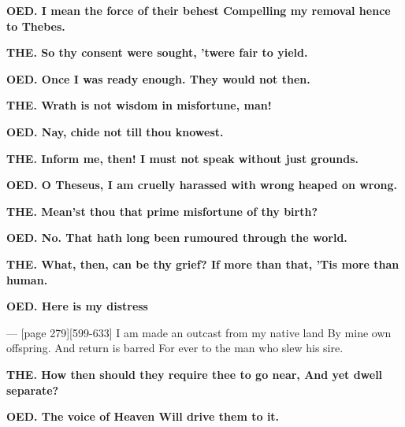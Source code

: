 \documentclass[11pt,letter]{book}
\begin{document}
\par \textbf{OED. I mean the force of their behest Compelling my removal hence to Thebes.}
\par 

\par \textbf{THE. So thy consent were sought, ’twere fair to yield.}
\par 

\par \textbf{OED. Once I was ready enough. They would not then.}
\par 

\par \textbf{THE. Wrath is not wisdom in misfortune, man!}
\par 

\par \textbf{OED. Nay, chide not till thou knowest.}
\par 

\par \textbf{THE. Inform me, then! I must not speak without just grounds.}
\par 

\par \textbf{OED. O Theseus, I am cruelly harassed with wrong heaped on wrong.}
\par 

\par \textbf{THE. Mean’st thou that prime misfortune of thy birth?}
\par 

\par \textbf{OED. No. That hath long been rumoured through the world.}
\par 

\par \textbf{THE. What, then, can be thy grief? If more than that, ’Tis more than human.}
\par 

\par \textbf{OED. Here is my distress}
\par  — [page 279][599-633] I am made an outcast from my native land By mine own offspring. And return is barred For ever to the man who slew his sire.

\par \textbf{THE. How then should they require thee to go near, And yet dwell separate?}
\par 

\par \textbf{OED. The voice of Heaven Will drive them to it.}
\par 
\end{document}
